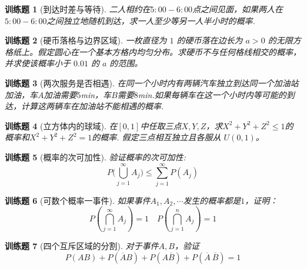 \documentclass[UTF8,12pt,a4paper,fontset=fandol]{ctexbook}
\newtheorem{exercise}{训练题}[section]
\begin{document}
\begin{exercise}[到达时差与等待]\label{q:Y1.12}
二人相约在$5:00-6:00$点之间见面，如果两人在$5:00-6:00$之间独立地随机到达，求一人至少等另一人半小时的概率.\par{}\end{exercise}

\begin{exercise}[硬币落格与边界区域]\label{q:Y1.13}
一枚直径为 $1$ 的硬币落在边长为 $a>0$ 的无限方格纸上。假定圆心在一个基本方格内均匀分布。求硬币不与任何格线相交的概率，并求使该概率小于 $0.01$ 的 $a$ 的范围。\par{}\end{exercise}

\begin{exercise}[两次服务是否相遇]\label{q:Y1.14}
在同一个小时内有两辆汽车独立到达同一个加油站加油，车$A$加油需要$5$min，车$B$需要$8$min.如果每辆车在这一个小时内等可能的到达，计算这两辆车在加油站不能相遇的概率.\par{}\end{exercise}

\begin{exercise}[立方体内的球域]\label{q:Y1.15}
在$[0,1]$中任取三点$X,Y,Z$，求$X^2+Y^2+Z^2\leqslant 1$的概率和$X^2+Y^2+Z^2=1$的概率. 假定三点相互独立且各服从 $U(0,1)$。\par{}\end{exercise}

\begin{exercise}[概率的次可加性]\label{q:Y1.17}
验证概率的次可加性:
\[P(\bigcup\limits_{j = 1}^\infty  {{A_j}) \leqslant } \sum\limits_{j = 1}^\infty  {P({A_j})} \]\par{}\end{exercise}

\begin{exercise}[可数个概率一事件]\label{q:Y1.18}
如果事件$A_1,A_2,\cdots$发生的概率都是$1$，证明：
\[P(\bigcap\limits_{j = 1}^\infty  {{A_j}} ) = 1\quad P(\bigcap\limits_{j = 1}^n {{A_j}} ) = 1\]\par{}\end{exercise}

\begin{exercise}[四个互斥区域的分割]\label{q:Y1.19}
对于事件$A,B$，验证
\[
P(AB)+P(\overline{A}B)+P(A\overline{B})+P(\overline{A}\:\overline{B})=1
\]\par{}\end{exercise}
\end{document}
